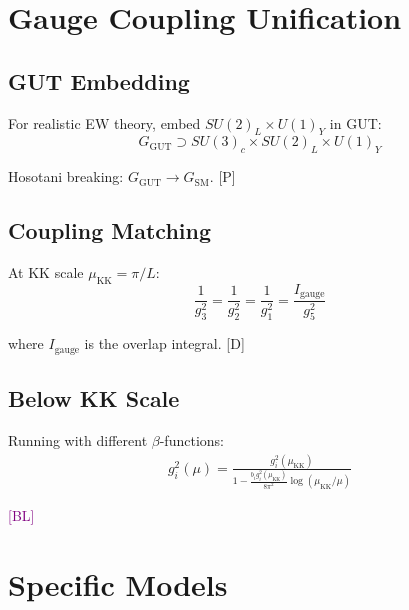\documentclass[11pt,a4paper]{article}
\newcommand{\tagD}{\textcolor{blue!70!black}{[D]}}
\newcommand{\tagP}{\textcolor{green!50!black}{[P]}}
\newcommand{\tagBL}{\textcolor{purple}{[BL]}}
\begin{document}
\section{Gauge Coupling Unification}

\subsection{GUT Embedding}

For realistic EW theory, embed $SU(2)_L \times U(1)_Y$ in GUT:
\begin{equation}
\label{eq:gut-embed}
G_{\text{GUT}} \supset SU(3)_c \times SU(2)_L \times U(1)_Y
\end{equation}

Hosotani breaking: $G_{\text{GUT}} \to G_{\text{SM}}$. \tagP

\subsection{Coupling Matching}

At KK scale $\mu_{\text{KK}} = \pi/L$:
\begin{equation}
\label{eq:coupling-match}
\frac{1}{g_3^2} = \frac{1}{g_2^2} = \frac{1}{g_1^2} = \frac{I_{\text{gauge}}}{g_5^2}
\end{equation}

where $I_{\text{gauge}}$ is the overlap integral. \tagD

\subsection{Below KK Scale}

Running with different $\beta$-functions:
\begin{align}
\label{eq:running}
g_i^2(\mu) = \frac{g_i^2(\mu_{\text{KK}})}{1 - \frac{b_i g_i^2(\mu_{\text{KK}})}{8\pi^2} \log(\mu_{\text{KK}}/\mu)}
\end{align}

\tagBL

\section{Specific Models}
\end{document}
